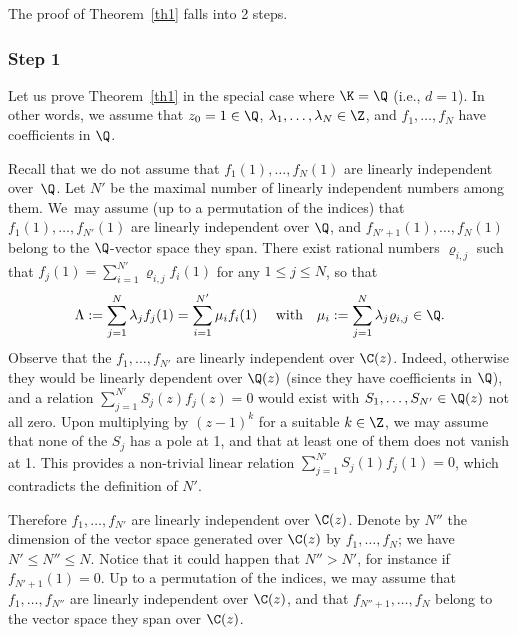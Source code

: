 The proof of Theorem~\ref{th1} falls into 2 steps.

\subsubsection*{Step 1}
Let us prove Theorem~\ref{th1} in the special case where $\K=\Q$ (i.e., $d=1$). In other words, we assume that $z_0=1\in\Q$, $\lambda_1,\ldots,\lambda_N\in\Z$, and $f_1,\ldots,f_N$ have coefficients in $\Q$.

Recall that we do not assume that $f_1(1),\ldots,f_N(1)$ are linearly independent over~$\Q$. Let $N'$ be the maximal number of linearly independent numbers among them. We~may assume (up to a permutation of the indices) that $f_1(1),\ldots,f_{N'}(1)$ are linearly independent over $\Q$, and $f_{N'+1}(1),\ldots,f_{N}(1)$ belong to the $\Q$-vector space they span. There exist rational numbers $\varrho_{i,j} $ such that
$f_j(1) = \sum_{i=1}^{N'} \varrho_{i,j} f_i(1)$ for any $1\leq j \leq N$, so that
\begin{equation}\label{eqlam2}
\Lambda := \sum_{j=1}^N \lambda_j f_j(1) = \sum_{i=1}^{N'} \mu_i f_i(1) \quad \mbox{ with} \quad
\mu_i := \sum_{j=1}^N \lambda_j \varrho_{i,j}\in\Q.
\end{equation}
Observe that the \Efunctions $f_1,\ldots,f_{N'}$ are linearly independent over $\C(z)$. Indeed, otherwise they would be linearly dependent over $\Q(z)$ (since they have coefficients in $\Q$), and a relation $\sum_{j=1}^{N'} S_j(z) f_j(z)=0$ would exist with $S_1, \ldots, S_{N'}\in \Q(z)$ not all zero. Upon multiplying by $(z-1)^k$ for a suitable $k\in\Z$, we may assume that none of the $S_j$ has a pole at 1, and that at least one of them does not vanish at 1. This provides a non-trivial linear relation $\sum_{j=1}^{N'} S_j(1) f_j(1)=0$, which contradicts the definition of $N'$.

Therefore $f_1,\ldots,f_{N'}$ are linearly independent over $\C(z)$. Denote by $N''$ the dimension of the vector space generated over $\C(z)$ by $f_1,\ldots,f_{N}$; we have $N'\leq N''\leq N$. Notice that it could happen that $N''>N'$, for instance if $f_{N'+1}(1)=0$. Up to a permutation of the indices, we may assume that $f_1,\ldots,f_{N''}$ are linearly independent over $\C(z)$, and that
$f_{N''+1},\ldots,f_{N}$ belong to the vector space they span over $\C(z)$.


